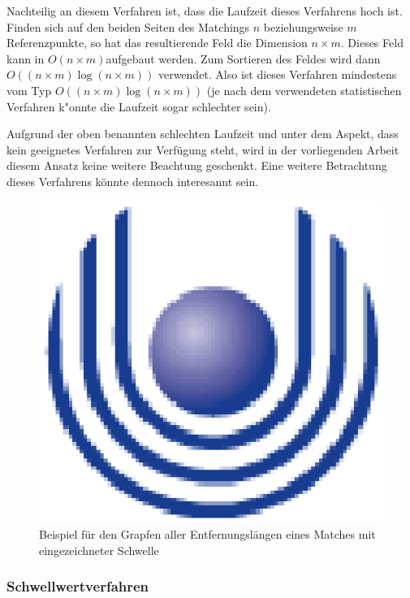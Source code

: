 Nachteilig an diesem Verfahren ist, dass die Laufzeit dieses Verfahrens hoch ist. Finden sich auf den beiden Seiten des Matchings $n$ beziehungsweise $m$ Referenzpunkte, so hat das resultierende Feld die Dimension $n\times m$. Dieses Feld kann in $O(n\times m)$aufgebaut werden. Zum Sortieren des Feldes wird dann $O((n\times m)\log(n\times m))$ verwendet. Also ist dieses Verfahren mindestens vom Typ $O((n\times m)\log(n\times m))$ (je nach dem verwendeten statistischen Verfahren k"onnte die Laufzeit sogar schlechter sein).

Aufgrund der oben benannten schlechten Laufzeit und unter dem Aspekt, dass kein geeignetes Verfahren zur Verfügung steht, wird in der vorliegenden Arbeit diesem Ansatz keine weitere Beachtung geschenkt. Eine weitere Betrachtung dieses Verfahrens könnte dennoch interesannt sein.

\begin{figure}
	\centering
	\includegraphics{feu_logo2.eps}
	\caption[Beispiel für eine statistische Analyse]{Beispiel für den Grapfen aller Entfernungslängen eines Matches mit eingezeichneter Schwelle}
	\label{fig:statistik}
\end{figure}


\subsubsection*{Schwellwertverfahren}\label{Schwellwert}

